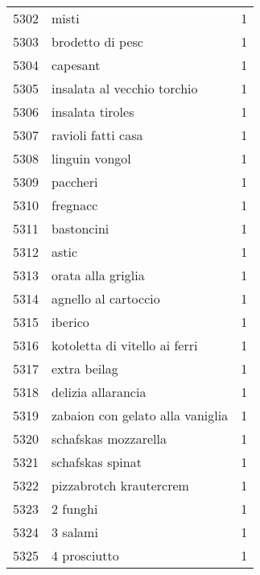 \begin{tabular}{llr}
5302 &                                              misti &      1 \\
5303 &                                   brodetto di pesc &      1 \\
5304 &                                           capesant &      1 \\
5305 &                        insalata al vecchio torchio &      1 \\
5306 &                                   insalata tiroles &      1 \\
5307 &                                 ravioli fatti casa &      1 \\
5308 &                                     linguin vongol &      1 \\
5309 &                                           paccheri &      1 \\
5310 &                                           fregnacc &      1 \\
5311 &                                         bastoncini &      1 \\
5312 &                                              astic &      1 \\
5313 &                                 orata alla griglia &      1 \\
5314 &                               agnello al cartoccio &      1 \\
5315 &                                            iberico &      1 \\
5316 &                      kotoletta di vitello ai ferri &      1 \\
5317 &                                       extra beilag &      1 \\
5318 &                                 delizia allarancia &      1 \\
5319 &                   zabaion con gelato alla vaniglia &      1 \\
5320 &                               schafskas mozzarella &      1 \\
5321 &                                   schafskas spinat &      1 \\
5322 &                            pizzabrotch krautercrem &      1 \\
5323 &                                           2 funghi &      1 \\
5324 &                                           3 salami &      1 \\
5325 &                                       4 prosciutto &      1 \\

\end{tabular}
